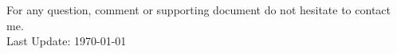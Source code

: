 \documentclass[]{friggeri-cv}
\begin{document}
\newline
\newline
\newline
For any question, comment or supporting document do not hesitate to contact me.\\
Last Update: \today
% 
\end{document}
